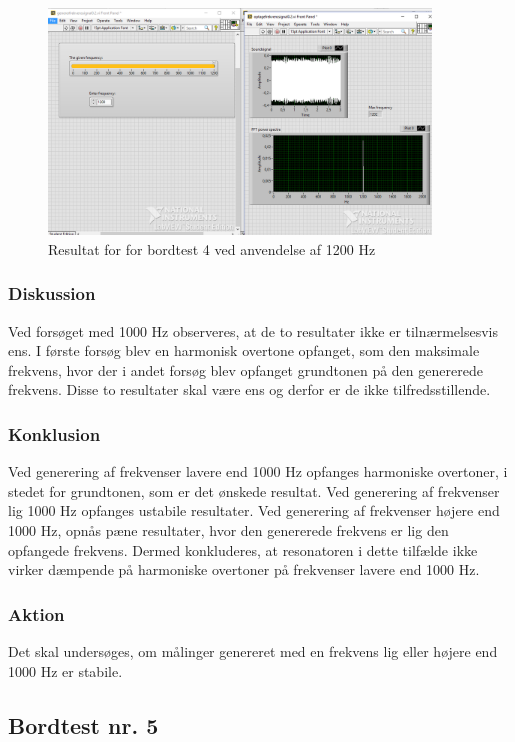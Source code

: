 {			\begin{figure}[htb]
			\centering
				\includegraphics[width=4in]{Bordtest41200Hz}
				\caption{Resultat for for bordtest 4 ved anvendelse af 1200 Hz}	
				\label{fig:bt41200}
			\end{figure} 
	
			  
			\subsubsection{Diskussion}
			Ved forsøget med 1000 Hz observeres, at de to resultater ikke er tilnærmelsesvis ens. I første forsøg blev en harmonisk overtone opfanget, som den maksimale frekvens, hvor der i andet forsøg blev opfanget grundtonen på den genererede frekvens. Disse to resultater skal være ens og derfor er de ikke tilfredsstillende.
			
			\subsubsection{Konklusion}
			Ved generering af frekvenser lavere end 1000 Hz opfanges harmoniske overtoner, i stedet for grundtonen, som er det ønskede resultat. 
			Ved generering af frekvenser lig 1000 Hz opfanges ustabile resultater. 
			Ved generering af frekvenser højere end 1000 Hz, opnås pæne resultater, hvor den genererede frekvens er lig den opfangede frekvens.  
			Dermed konkluderes, at resonatoren i dette tilfælde ikke virker dæmpende på harmoniske overtoner på frekvenser lavere end 1000 Hz. 
			  
			\subsubsection{Aktion}
			Det skal undersøges, om målinger genereret med en frekvens lig eller højere end 1000 Hz er stabile. 
			
			\subsection{Bordtest nr. 5} %
}
